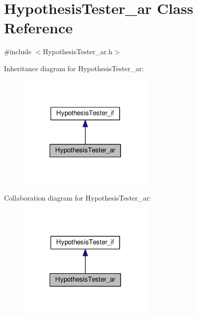 \hypertarget{class_hypothesis_tester__ar}{\section{Hypothesis\-Tester\-\_\-ar Class Reference}
\label{class_hypothesis_tester__ar}
}


{\ttfamily \#include $<$Hypothesis\-Tester\-\_\-ar.\-h$>$}



Inheritance diagram for Hypothesis\-Tester\-\_\-ar\-:
\nopagebreak
\begin{figure}[H]
\begin{center}
\leavevmode
\includegraphics[width=186pt]{class_hypothesis_tester__ar__inherit__graph}
\end{center}
\end{figure}


Collaboration diagram for Hypothesis\-Tester\-\_\-ar\-:
\nopagebreak
\begin{figure}[H]
\begin{center}
\leavevmode
\includegraphics[width=186pt]{class_hypothesis_tester__ar__coll__graph}
\end{center}
\end{figure}
